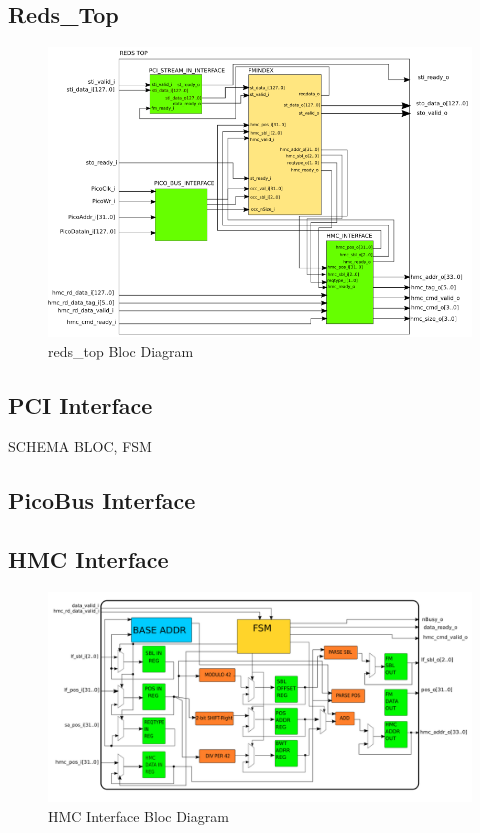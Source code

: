 \subsection{Reds\_Top}
\begin{figure}[H]
    \centering
    \includegraphics[scale = 0.55]{Figures/REDS_TOP_DIAG.png}
    \caption{reds\_top Bloc Diagram}
    \label{fig:reds_top_diag}
\end{figure}

\subsection{PCI Interface}

SCHEMA BLOC, FSM

\subsection{PicoBus Interface}

\subsection{HMC Interface}

\begin{figure}[H]
    \centering
    \hspace*{-20mm}\includegraphics[scale = 0.45]{Figures/HMC_DIAG.png}
    \caption{HMC Interface Bloc Diagram}
    \label{fig:seqschema}
\end{figure}

